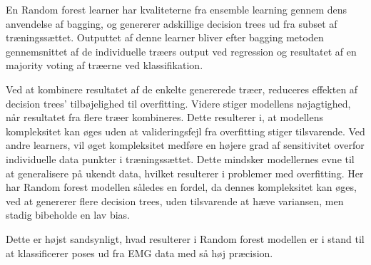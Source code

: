 En Random forest learner har kvaliteterne fra ensemble learning gennem dens anvendelse af bagging, og genererer adskillige decision trees ud fra subset af træningssættet. Outputtet af denne learner bliver efter bagging metoden gennemsnittet af de individuelle træers output ved regression og resultatet af en majority voting af træerne ved klassifikation. 


Ved at kombinere resultatet af de enkelte genererede træer, reduceres effekten af decision trees' tilbøjelighed til overfitting. Videre stiger modellens nøjagtighed, når resultatet fra flere træer kombineres. Dette resulterer i, at modellens kompleksitet kan øges uden at valideringsfejl fra overfitting stiger tilsvarende. 
Ved andre learners, vil øget kompleksitet medføre en højere grad af sensitivitet overfor individuelle data punkter i træningssættet. Dette mindsker modellernes evne til at generalisere på ukendt data, hvilket resulterer i problemer med overfitting. Her har Random forest modellen således en fordel, da dennes kompleksitet kan øges, ved at genererer flere decision trees, uden tilsvarende at hæve variansen, men stadig bibeholde en lav bias. 

Dette er højst sandsynligt, hvad resulterer i Random forest modellen er i stand til at klassificerer poses ud fra EMG data med så høj præcision.   

